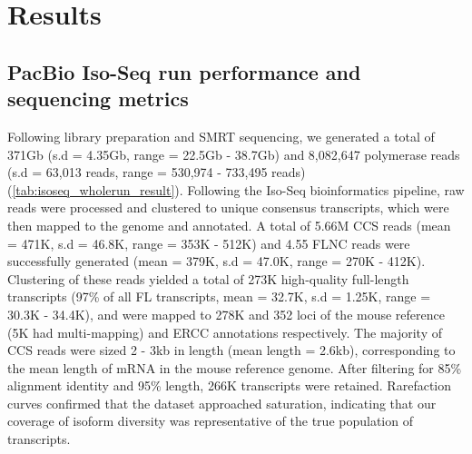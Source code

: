 \newpage
\section{Results}

\subsection{PacBio Iso-Seq run performance and sequencing metrics}
Following library preparation and SMRT sequencing, we generated a total of 371Gb (s.d = 4.35Gb, range = 22.5Gb - 38.7Gb) and 8,082,647 polymerase reads (s.d = 63,013 reads, range = 530,974 - 733,495 reads) (\cref{tab:isoseq_wholerun_result}). Following the Iso-Seq bioinformatics pipeline, raw reads were processed and clustered to unique consensus transcripts, which were then mapped to the genome and annotated. A total of 5.66M CCS reads (mean = 471K, s.d = 46.8K, range =  353K - 512K) and 4.55 FLNC reads were successfully generated (mean = 379K, s.d = 47.0K, range = 270K - 412K). Clustering of these reads yielded a total of 273K high-quality full-length transcripts (97\% of all FL transcripts, mean = 32.7K, s.d = 1.25K, range = 30.3K - 34.4K), and were mapped to 278K and 352 loci of the mouse reference (5K had multi-mapping) and ERCC annotations respectively. The majority of CCS reads were sized 2 - 3kb in length (mean length = 2.6kb), corresponding to the mean length of mRNA in the mouse reference genome. After filtering for 85\% alignment identity and 95\% length, 266K transcripts were retained. Rarefaction curves confirmed that the dataset approached saturation, indicating that our coverage of isoform diversity was representative of the true population of transcripts. 

